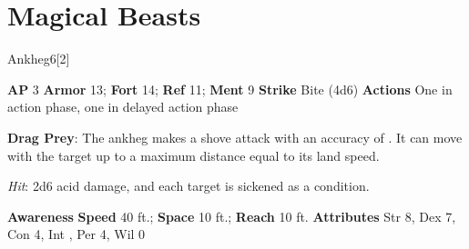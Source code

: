\section{Magical Beasts}
\begin{monsection}{Ankheg}{6}[2]
\vspace{-1em}\vspace{-1em}
\begin{spellcontent}
\begin{spelltargetinginfo}
{\textbf{AP} 3}
\pari \textbf{Armor} 13;
\textbf{Fort} 14;
\textbf{Ref} 11;
\textbf{Ment} 9
\pari \textbf{Strike} Bite  (4d6)
\pari \textbf{Actions} One in action phase, one in delayed action phase
\end{spelltargetinginfo}
\begin{spelleffects}
\pari
\textbf{Drag Prey}:
The ankheg makes a shove attack with an accuracy of .
It can move with the target up to a maximum distance equal to its land speed.
\vspace{0.5em}
\pari
{}
\par
\par \textit{Hit}: 2d6 acid damage, and each target is sickened as a condition.
\end{spelleffects}
\end{spellcontent}
\begin{spellsubcontent}
\begin{spellfooter}
\pari \textbf{Awareness} 
\pari \textbf{Speed} 40 ft.;
\textbf{Space} 10 ft.;
\textbf{Reach} 10 ft.
\pari \textbf{Attributes}
Str 8,
Dex 7,
Con 4,
Int ,
Per 4,
Wil 0
\end{spellfooter}
\end{spellsubcontent}
\end{monsection}
